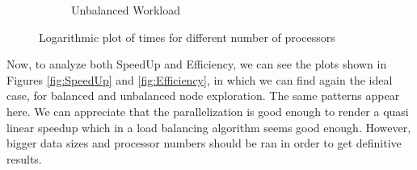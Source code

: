 \documentclass[a4paper]{article}
\begin{document}
\begin{figure}[htp!]
\begin{subfigure}{.5\textwidth}
        \caption{Unbalanced Workload}
        \label{fig:unbalanced}
      \end{subfigure}
      \caption{Logarithmic plot of times for different number of processors}
    \end{figure}

    Now, to analyze both SpeedUp and Efficiency, we can see the plots shown in Figures \ref{fig:SpeedUp} and \ref{fig:Efficiency}, in which we can find again the ideal case, for balanced and unbalanced node exploration. The same patterns appear here. We can appreciate that the parallelization is good enough to render a quasi linear speedup which in a load balancing algorithm seems good enough. However, bigger data sizes and processor numbers should be ran in order to get definitive results.

    

\end{document}
